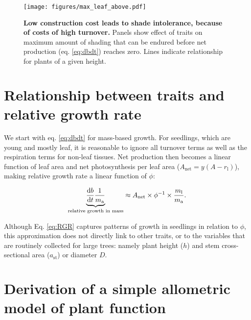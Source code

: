 \documentclass[12pt, a4paper]{article}
\makeatletter
\def\maxwidth{\ifdim\Gin@nat@width>\linewidth\linewidth
\else\Gin@nat@width\fi}
\let\Oldincludegraphics\includegraphics
\renewcommand{\includegraphics}[1]{\Oldincludegraphics[width=\maxwidth]{#1}}
\makeatother
\begin{document}
\newpage

\begin{figure}[ht]
\centering
\texttt{[image: figures/max\_leaf\_above.pdf]}
\caption{\textbf{Low construction cost leads to shade intolerance,
because of costs of high turnover.} Panels show effect of traits on
maximum amount of shading that can be endured before net production (eq.
\ref{eq:dbdt}) reaches zero. Lines indicate relationship for plants of a
given height. \label{f-wplcp}}
\end{figure}

\clearpage

\begin{appendices}
\setcounter{figure}{0} \renewcommand{\thefigure}{S\arabic{figure}}
\setcounter{table}{0} \renewcommand{\thetable}{S\arabic{table}}

\section{Relationship between traits and relative growth rate} \label{app:traits-RGR}

We start with eq. \ref{eq:dbdt} for mass-based growth. For seedlings, which are
young and mostly leaf, it is reasonable to ignore all turnover terms as
well as the respiration terms for non-leaf tissues. Net production then
becomes a linear function of leaf area and net photosynthesis per leaf
area ($A_\textrm{net} = y(A - r_\textrm{l})$), making relative growth
rate a linear function of $\phi$:

\begin{equation}\label{eq:RGR}
\underbrace{\strut\frac{\textrm{d}b}{\textrm{d}t}\frac{1}{m_\textrm{a}}}_\textrm{relative growth in mass}  \approx A_\textrm{net} \times \phi^{-1} \times \frac{m_\textrm{l}}{m_\textrm{a}}. \end{equation}

Although Eq. \ref{eq:RGR} captures patterns of growth in seedlings in
relation to $\phi$\citep{wright_cross-2000}, this
approximation does not directly link to other traits, or to the
variables that are routinely collected for large trees: namely plant
height ($h$) and stem cross-sectional area ($a_\textrm{st}$) or
diameter $D$.


\section{Derivation of a simple allometric model of plant
function}\label{app:func_balance}


\end{appendices}
\end{document}

